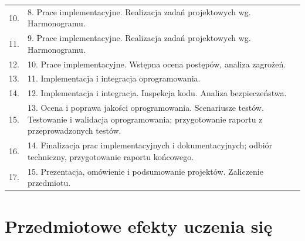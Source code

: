 \documentclass[12pt, a4paper]{article}
\begin{document}
{\begin{longtable}{m{1.5cm}m{14.5cm}}
  \rowcolor{tableRowAlt} 10. & 8. Prace implementacyjne. Realizacja zadań projektowych wg. Harmonogramu. \\
  \rowcolor{tableRowLight} 11. & 9. Prace implementacyjne. Realizacja zadań projektowych wg. Harmonogramu. \\
  \rowcolor{tableRowAlt} 12. & 10. Prace implementacyjne. Wstępna ocena postępów, analiza zagrożeń. \\
  \rowcolor{tableRowLight} 13. & 11. Implementacja i integracja oprogramowania. \\
  \rowcolor{tableRowAlt} 14. & 12. Implementacja i integracja. Inspekcja kodu. Analiza bezpieczeństwa. \\
  \rowcolor{tableRowLight} 15. & 13. Ocena i poprawa jakości oprogramowania. Scenariusze testów. Testowanie i walidacja oprogramowania; przygotowanie raportu z przeprowadzonych testów. \\
  \rowcolor{tableRowAlt} 16. & 14. Finalizacja prac implementacyjnych i dokumentacyjnych; odbiór techniczny, przygotowanie raportu końcowego. \\
  \rowcolor{tableRowLight} 17. & 15. Prezentacja, omówienie i podsumowanie projektów. Zaliczenie przedmiotu. \\
\bottomrule
\end{longtable}}

\section{Przedmiotowe efekty uczenia się}
\end{document}
